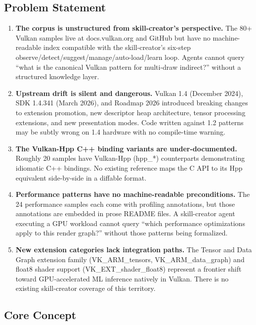 \documentclass[11pt,letterpaper]{article}
\begin{document}
\subsection{Problem Statement}

\begin{enumerate}
  \item \textbf{The corpus is unstructured from skill-creator's perspective.} The 80+ Vulkan samples live at docs.vulkan.org and GitHub but have no machine-readable index compatible with the skill-creator's six-step observe/detect/suggest/manage/auto-load/learn loop. Agents cannot query ``what is the canonical Vulkan pattern for multi-draw indirect?'' without a structured knowledge layer.

  \item \textbf{Upstream drift is silent and dangerous.} Vulkan 1.4 (December 2024), SDK 1.4.341 (March 2026), and Roadmap 2026 introduced breaking changes to extension promotion, new descriptor heap architecture, tensor processing extensions, and new presentation modes. Code written against 1.2 patterns may be subtly wrong on 1.4 hardware with no compile-time warning.

  \item \textbf{The Vulkan-Hpp C++ binding variants are under-documented.} Roughly 20 samples have Vulkan-Hpp (hpp\_*) counterparts demonstrating idiomatic C++ bindings. No existing reference maps the C API to its Hpp equivalent side-by-side in a diffable format.

  \item \textbf{Performance patterns have no machine-readable preconditions.} The 24 performance samples each come with profiling annotations, but those annotations are embedded in prose README files. A skill-creator agent executing a GPU workload cannot query ``which performance optimizations apply to this render graph?'' without those patterns being formalized.

  \item \textbf{New extension categories lack integration paths.} The Tensor and Data Graph extension family (VK\_ARM\_tensors, VK\_ARM\_data\_graph) and float8 shader support (VK\_EXT\_shader\_float8) represent a frontier shift toward GPU-accelerated ML inference natively in Vulkan. There is no existing skill-creator coverage of this territory.
\end{enumerate}

\subsection{Core Concept}
\end{document}
